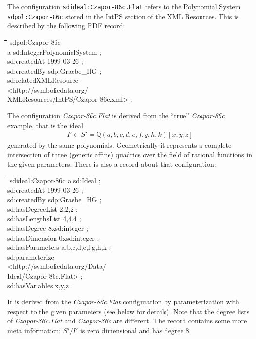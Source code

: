 \documentclass[a4paper,11pt]{article}
\newenvironment{code}{\par\small\tt\footnotesize \begin{tabbing}
\hskip12pt\=\hskip12pt\=\hskip12pt\=\hskip12pt\=\hskip5cm\=\hskip5cm\=\kill}
{\end{tabbing}\normalsize}
\newcommand{\xsdprefix}{\char94\char94} %
\begin{document}
\begin{multicols}{2}
The configuration \texttt{sdideal:Czapor-86c.Flat} refers to the Polynomial
System \texttt{sdpol:Czapor-86c} stored in the IntPS section of the {\SD} XML
Resources. This is described by the following RDF record:
\begin{code}
  sdpol:Czapor-86c\+\\
  a sd:IntegerPolynomialSystem ;\\
  sd:createdAt {\dq}1999-03-26{\dq} ;\\
  sd:createdBy sdp:Graebe\_HG ;\\
  sd:relatedXMLResource\\
  <http://symbolicdata.org/\\\> XMLResources/IntPS/Czapor-86c.xml> . 
\end{code}

The configuration \emph{Czapor-86c.Flat} is derived from the ``true''
\emph{Czapor-86c} example, that is the ideal
\begin{gather*}
  I'\subset S'=\mathbb{Q}(a,b,c,d,e,f,g,h,k)[x,y,z]
\end{gather*}
generated by the same polynomials. Geometrically it represents a complete
intersection of three (generic affine) quadrics over the field of rational
functions in the given parameters.  There is also a record about that
configuration:
\begin{code}
  sdideal:Czapor-86c a sd:Ideal ;\+\\
  sd:createdAt {\dq}1999-03-26{\dq} ;\\
  sd:createdBy sdp:Graebe\_HG ;\\
  sd:hasDegreeList {\dq}2,2,2{\dq} ;\\
  sd:hasLengthsList {\dq}4,4,4{\dq} ;\\
  sd:hasDegree {\dq}8{\dq}{\xsdprefix}xsd:integer ;\\
  sd:hasDimension {\dq}0{\dq}{\xsdprefix}xsd:integer ;\\
  sd:hasParameters {\dq}a,b,c,d,e,f,g,h,k{\dq} ;\\
  sd:parameterize\\\> <http://symbolicdata.org/Data/\\\>\>
  Ideal/Czapor-86c.Flat> ;\\ 
  sd:hasVariables {\dq}x,y,z{\dq} .\\
\end{code}
It is derived from the \emph{Czapor-86c.Flat} configuration by
parameterization with respect to the given parameters (see below for details).
Note that the degree lists of \emph{Czapor-86c.Flat} and \emph{Czapor-86c} are
different.  The record contains some more meta information: $S'/I'$ is zero
dimensional and has degree 8.


\end{multicols}
\end{document}
